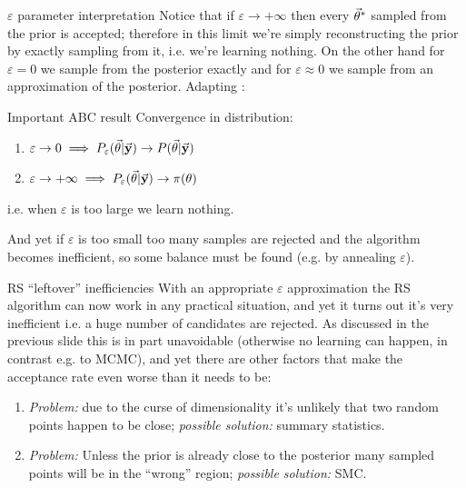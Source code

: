 \documentclass{beamer}
\theoremstyle{remark}
\newcommand{\nologo}{\setbeamertemplate{logo}{}} %
\begin{document}
{\nologo
\begin{frame}{$\varepsilon$ parameter interpretation}
Notice that if $\varepsilon \to +\infty$ then every $\va{\theta}^*$ sampled from the prior is accepted; therefore in this limit we're simply reconstructing the prior by exactly sampling from it, i.e. we're learning nothing. On the other hand for $\varepsilon = 0$ we sample from the posterior exactly and for $\varepsilon \approx 0$ we sample from an approximation of the posterior. Adapting \cite{abc_slides}:
\pause
\begin{block}{Important ABC result}
Convergence in distribution:
\begin{enumerate}
    \item $\varepsilon\to 0\implies P_\varepsilon(\va{\theta}|\va{y})\to P(\va{\theta}|\va{y})$
    \item $\varepsilon\to +\infty\implies P_\varepsilon(\va{\theta}|\va{y})\to \pi(\theta)$
\end{enumerate}
i.e. when $\varepsilon$ is too large we learn nothing.
\end{block}
\pause
And yet if $\varepsilon$ is too small too many samples are rejected and the algorithm becomes inefficient, so some balance must be found (e.g. by annealing $\varepsilon$).
\end{frame}
}
\begin{frame}{RS ``leftover'' inefficiencies}
With an appropriate $\varepsilon$ approximation the RS algorithm can now work in any practical situation, and yet it turns out it's very inefficient i.e. a huge number of candidates are rejected. As discussed in the previous slide this is in part unavoidable (otherwise no learning can happen, in contrast e.g. to MCMC), and yet there are other factors that make the acceptance rate even worse than it needs to be:\pause
\begin{enumerate}[<+->]
    \item \textit{Problem:} due to the curse of dimensionality it's unlikely that two random points happen to be close; \textit{possible solution:} summary statistics.
    \item \textit{Problem:} Unless the prior is already close to the posterior many sampled points will be in the ``wrong'' region; \textit{possible solution:} SMC.
\end{enumerate}
    
\end{frame}
\end{document}
